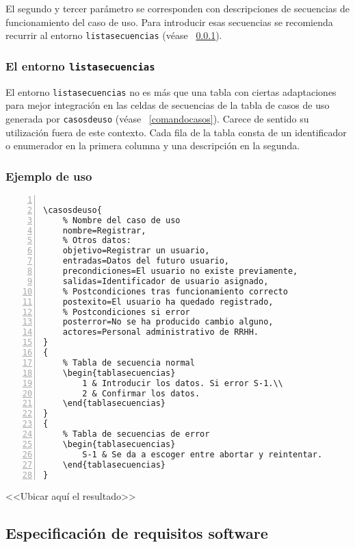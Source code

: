 \documentclass[draft]{ltxdoc}
\begin{document}
	El segundo y tercer parámetro se corresponden con descripciones de secuencias de funcionamiento del caso de uso. Para introducir esas secuencias se recomienda recurrir al entorno \verb|listasecuencias| (véase ~\ref{entornosecuencias}).

\subsubsection{El entorno \texttt{listasecuencias}} \label{entornosecuencias}
	El entorno \verb|listasecuencias| no es más que una tabla con ciertas adaptaciones para mejor integración en las celdas de secuencias de la tabla de casos de uso generada por \verb|casosdeuso| (véase ~\ref{comandocasos}). Carece de sentido su utilización fuera de este contexto. Cada fila de la tabla consta de un identificador o enumerador en la primera columna y una descripción en la segunda.

\subsubsection{Ejemplo de uso}
\begin{Verbatim}[numbers=left, label=Ejemplo]
% Ejemplo de caso de uso.
		
\casosdeuso{
	% Nombre del caso de uso
	nombre=Registrar,
	% Otros datos:
	objetivo=Registrar un usuario,
	entradas=Datos del futuro usuario,
	precondiciones=El usuario no existe previamente,
	salidas=Identificador de usuario asignado,
	% Postcondiciones tras funcionamiento correcto
	postexito=El usuario ha quedado registrado,
	% Postcondiciones si error
	posterror=No se ha producido cambio alguno,
	actores=Personal administrativo de RRHH.
}
{
	% Tabla de secuencia normal
	\begin{tablasecuencias}
		1 & Introducir los datos. Si error S-1.\\
		2 & Confirmar los datos.
	\end{tablasecuencias}
}
{
	% Tabla de secuencias de error
	\begin{tablasecuencias}
		S-1 & Se da a escoger entre abortar y reintentar.
	\end{tablasecuencias}
}
\end{Verbatim}

<<Ubicar aquí el resultado>>

\subsection{Especificación de requisitos software}
\end{document}
